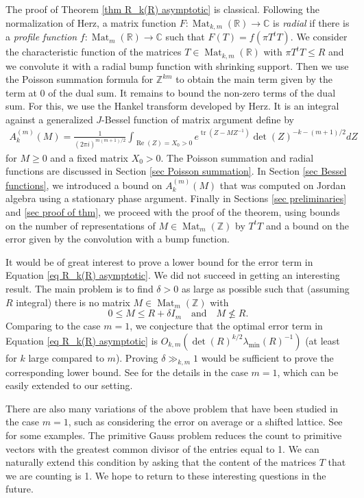 \documentclass[oneside]{amsart}
\numberwithin{equation}{section}
\theoremstyle{definition}
\theoremstyle{remark}
\theoremstyle{remark}
\renewcommand{\Re}{\operatorname{Re}}
\newcommand{\CC}{\mathbb C}								%
\newcommand{\RR}{\mathbb R}
\newcommand{\ZZ}{\mathbb Z}
\DeclareMathOperator{\Mat}{Mat}
\DeclareMathOperator{\tr}{tr}
\begin{document}
The proof of Theorem \ref{thm R_k(R) asymptotic} is classical. Following the normalization of Herz, a matrix function $F:\Mat_{k,m}(\RR)\to\CC$ is \emph{radial} if there is a \emph{profile function} $f:\Mat_m(\RR)\to\CC$ such that $F(T)=f(\pi T^tT)$. We consider the characteristic function of the matrices $T\in\Mat_{k,m}(\RR)$ with $\pi T^tT\leq R$ and we convolute it with a radial bump function with shrinking support. Then we use the Poisson summation formula for $\ZZ^{km}$ to obtain the main term given by the term at 0 of the dual sum. It remains to bound the non-zero terms of the dual sum. For this, we use the Hankel transform developed by Herz. It is an integral against a generalized $J$-Bessel function of matrix argument define by
\begin{align}\label{eq definition A_k}
A_k^{(m)}(M)=\frac1{(2\pi i)^{m(m+1)/2}}\int_{\Re(Z)=X_0>0}e^{\tr(Z-MZ^{-1})}\det(Z)^{-k-(m+1)/2}dZ
\end{align}
for $M\geq0$ and a fixed matrix $X_0>0$. The Poisson summation and radial functions are discussed in Section \ref{sec Poisson summation}. In Section \ref{sec Bessel functions}, we introduced a bound on $A_k^{(m)}(M)$ that was computed on Jordan algebra using a stationary phase argument. Finally in Sections \ref{sec preliminaries} and \ref{sec proof of thm}, we proceed with the proof of the theorem, using bounds on the number of representations of $M\in\Mat_m(\ZZ)$ by $T^tT$ and a bound on the error given by the convolution with a bump function.

It would be of great interest to prove a lower bound for the error term in Equation \eqref{eq R_k(R) asymptotic}. We did not succeed in getting an interesting result. The main problem is to find $\delta>0$ as large as possible such that (assuming $R$ integral) there is no matrix $M\in\Mat_m(\ZZ)$ with
$$0\leq M\leq R+\delta I_m\quad \text{and}\quad M\not\leq R.$$
Comparing to the case $m=1$, we conjecture that the optimal error term in Equation \eqref{eq R_k(R) asymptotic} is $O_{k,m}(\det(R)^{k/2}\lambda_{\min}(R)^{-1})$ (at least for $k$ large compared to $m$). Proving $\delta\gg_{k,m}1$ would be sufficient to prove the corresponding lower bound. See \cite[Satz 5.9]{Krae00} for the details in the case $m=1$, which can be easily extended to our setting.

There are also many variations of the above problem that have been studied in the case $m=1$, such as considering the error on average or a shifted lattice. See \cite{EL25} for some examples. The primitive Gauss problem reduces the count to primitive vectors with the greatest common divisor of the entries equal to 1. We can naturally extend this condition by asking that the content of the matrices $T$ that we are counting is 1. We hope to return to these interesting questions in the future.
\end{document}

